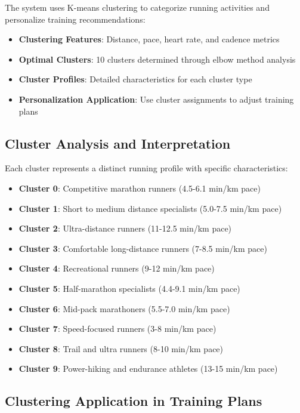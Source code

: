 The system uses K-means clustering to categorize running activities and personalize training recommendations:

\begin{itemize}
    \item \textbf{Clustering Features}: Distance, pace, heart rate, and cadence metrics
    \item \textbf{Optimal Clusters}: 10 clusters determined through elbow method analysis
    \item \textbf{Cluster Profiles}: Detailed characteristics for each cluster type
    \item \textbf{Personalization Application}: Use cluster assignments to adjust training plans
\end{itemize}

\subsection{Cluster Analysis and Interpretation}

Each cluster represents a distinct running profile with specific characteristics:

\begin{itemize}
    \item \textbf{Cluster 0}: Competitive marathon runners (4.5-6.1 min/km pace)
    \item \textbf{Cluster 1}: Short to medium distance specialists (5.0-7.5 min/km pace)
    \item \textbf{Cluster 2}: Ultra-distance runners (11-12.5 min/km pace)
    \item \textbf{Cluster 3}: Comfortable long-distance runners (7-8.5 min/km pace)
    \item \textbf{Cluster 4}: Recreational runners (9-12 min/km pace)
    \item \textbf{Cluster 5}: Half-marathon specialists (4.4-9.1 min/km pace)
    \item \textbf{Cluster 6}: Mid-pack marathoners (5.5-7.0 min/km pace)
    \item \textbf{Cluster 7}: Speed-focused runners (3-8 min/km pace)
    \item \textbf{Cluster 8}: Trail and ultra runners (8-10 min/km pace)
    \item \textbf{Cluster 9}: Power-hiking and endurance athletes (13-15 min/km pace)
\end{itemize}

\subsection{Clustering Application in Training Plans}

